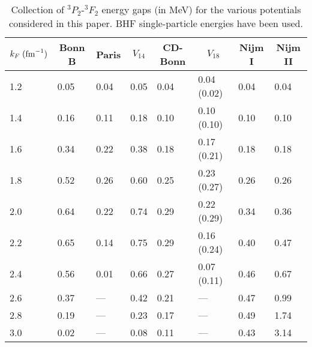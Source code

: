 \begin{table}[t]
\begin{center}
\begin{tabular}{llllllll} 
\multicolumn{1}{c}{$k_F\;({\rm fm}^{-1})$}&\multicolumn{1}{c}{Bonn B}&
\multicolumn{1}{c}{Paris}&\multicolumn{1}{c}{$V_{14}$}& 
\multicolumn{1}{c}{CD-Bonn}&\multicolumn{1}{c}{$V_{18}$}&
\multicolumn{1}{c}{Nijm I}&\multicolumn{1}{c}{Nijm II} \\ \hline  
     1.2  & 0.05 & 0.04  & 0.05 & 0.04 & 0.04 (0.02) & 0.04  & 0.04  \\
     1.4  & 0.16 & 0.11  & 0.18 & 0.10 & 0.10 (0.10) & 0.10  & 0.10  \\
     1.6  & 0.34 & 0.22  & 0.38 & 0.18 & 0.17 (0.21) & 0.18  & 0.18  \\
     1.8  & 0.52 & 0.26  & 0.60 & 0.25 & 0.23 (0.27) & 0.26  & 0.26  \\
     2.0  & 0.64 & 0.22  & 0.74 & 0.29 & 0.22 (0.29) & 0.34  & 0.36  \\
     2.2  & 0.65 & 0.14  & 0.75 & 0.29 & 0.16 (0.24) & 0.40  & 0.47  \\
     2.4  & 0.56 & 0.01  & 0.66 & 0.27 & 0.07 (0.11) & 0.46  & 0.67  \\
     2.6  & 0.37 & ---  & 0.42 & 0.21 & ---        & 0.47  & 0.99  \\
     2.8  & 0.19 & ---  & 0.23 & 0.17 & ---        & 0.49  & 1.74  \\
     3.0  & 0.02 & ---  & 0.08 & 0.11 & ---        & 0.43  & 3.14  \\ \hline
\end{tabular}
\caption{Collection of $^3P_2$-$^3F_2$ energy gaps (in MeV) for the 
various potentials considered in this paper.  
BHF single-particle energies have been used.}
\label{tab:tab2}
\end{center}
\end{table} 






